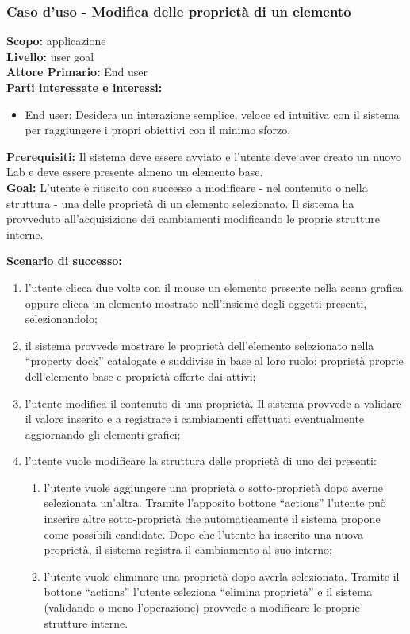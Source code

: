\begin{flushleft}
\begin{boxedminipage}{\textwidth}

\subsubsection*{Caso d'uso - Modifica delle proprietà di un elemento}

\textbf{Scopo:} applicazione \visualnetkit{} \\
\textbf{Livello:} user goal \\
\textbf{Attore Primario:} End user \\
\textbf{Parti interessate e interessi:}
\begin{itemize}
\item End user: Desidera un interazione semplice, veloce ed intuitiva con il sistema per raggiungere i propri obiettivi con il minimo sforzo.
\end{itemize}

\textbf{Prerequisiti:} Il sistema deve essere avviato e l'utente deve aver creato un nuovo Lab e deve essere presente almeno un elemento base. \\
\textbf{Goal:} L'utente è riuscito con successo a modificare - nel contenuto o nella struttura - una delle proprietà di un elemento selezionato. Il sistema ha provveduto all'acquisizione dei cambiamenti modificando le proprie strutture interne.

\textbf{Scenario di successo:}
\begin{enumerate}
\item l'utente clicca due volte con il mouse un elemento presente nella scena grafica oppure clicca un elemento mostrato nell'insieme degli oggetti presenti, selezionandolo;
\item il sistema provvede mostrare le proprietà dell'elemento selezionato nella ``property dock'' catalogate e suddivise in base al loro ruolo: proprietà proprie dell'elemento base e proprietà offerte dai \plugin{} attivi;
\item l'utente modifica il contenuto di una proprietà. Il sistema provvede a validare il valore inserito e a registrare i cambiamenti effettuati eventualmente aggiornando gli elementi grafici;
\item l'utente vuole modificare la struttura delle proprietà di uno dei \plugin{} presenti:
	\begin{enumerate}
	\item l'utente vuole aggiungere una proprietà o sotto-proprietà dopo averne selezionata un'altra. Tramite l'apposito bottone ``actions'' l'utente può inserire altre sotto-proprietà che automaticamente il sistema propone come possibili candidate. Dopo che l'utente ha inserito una nuova proprietà, il sistema registra il cambiamento al suo interno;
	\item l'utente vuole eliminare una proprietà dopo averla selezionata. Tramite il bottone ``actions'' l'utente seleziona ``elimina proprietà'' e il sistema (validando o meno l'operazione) provvede a modificare le proprie strutture interne.
	\end{enumerate}
\end{enumerate}


\end{boxedminipage}
\end{flushleft}
